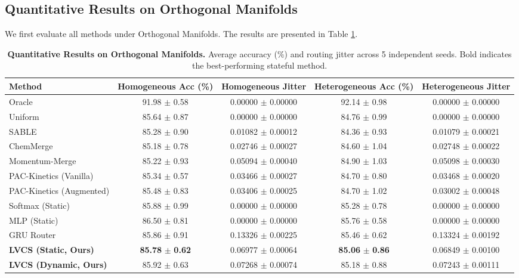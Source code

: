 \subsection{Quantitative Results on Orthogonal Manifolds}
We first evaluate all methods under Orthogonal Manifolds. The results are presented in Table \ref{tab:orthogonal_results}.

\begin{table}[t]
\caption{\textbf{Quantitative Results on Orthogonal Manifolds.} Average accuracy ($\%$) and routing jitter across 5 independent seeds. Bold indicates the best-performing stateful method.}
\label{tab:orthogonal_results}
\vskip 0.15in
\begin{center}
\begin{small}
\begin{sc}
\begin{tabular}{lcccc}
\toprule
Method & Homogeneous Acc (\%) & Homogeneous Jitter & Heterogeneous Acc (\%) & Heterogeneous Jitter \\
\midrule
Oracle & 91.98 $\pm$ 0.58 & 0.00000 $\pm$ 0.00000 & 92.14 $\pm$ 0.98 & 0.00000 $\pm$ 0.00000 \\
Uniform & 85.64 $\pm$ 0.87 & 0.00000 $\pm$ 0.00000 & 84.76 $\pm$ 0.99 & 0.00000 $\pm$ 0.00000 \\
SABLE & 85.28 $\pm$ 0.90 & 0.01082 $\pm$ 0.00012 & 84.36 $\pm$ 0.93 & 0.01079 $\pm$ 0.00021 \\
\midrule
ChemMerge & 85.18 $\pm$ 0.78 & 0.02746 $\pm$ 0.00027 & 84.60 $\pm$ 1.04 & 0.02748 $\pm$ 0.00022 \\
Momentum-Merge & 85.22 $\pm$ 0.93 & 0.05094 $\pm$ 0.00040 & 84.90 $\pm$ 1.03 & 0.05098 $\pm$ 0.00030 \\
PAC-Kinetics (Vanilla) & 85.34 $\pm$ 0.57 & 0.03466 $\pm$ 0.00027 & 84.70 $\pm$ 0.80 & 0.03468 $\pm$ 0.00020 \\
PAC-Kinetics (Augmented) & 85.48 $\pm$ 0.83 & 0.03406 $\pm$ 0.00025 & 84.70 $\pm$ 1.02 & 0.03002 $\pm$ 0.00048 \\
Softmax (Static) & 85.88 $\pm$ 0.99 & 0.00000 $\pm$ 0.00000 & 85.28 $\pm$ 0.78 & 0.00000 $\pm$ 0.00000 \\
MLP (Static) & 86.50 $\pm$ 0.81 & 0.00000 $\pm$ 0.00000 & 85.76 $\pm$ 0.58 & 0.00000 $\pm$ 0.00000 \\
GRU Router & 85.86 $\pm$ 0.91 & 0.13326 $\pm$ 0.00225 & 85.46 $\pm$ 0.62 & 0.13324 $\pm$ 0.00192 \\
\textbf{LVCS (Static, Ours)} & \textbf{85.78} $\pm$ \textbf{0.62} & 0.06977 $\pm$ 0.00064 & \textbf{85.06} $\pm$ \textbf{0.86} & 0.06849 $\pm$ 0.00100 \\
\textbf{LVCS (Dynamic, Ours)} & 85.92 $\pm$ 0.63 & 0.07268 $\pm$ 0.00074 & 85.18 $\pm$ 0.88 & 0.07243 $\pm$ 0.00111 \\
\bottomrule
\end{tabular}
\end{sc}
\end{small}
\end{center}
\vskip -0.1in
\end{table}

